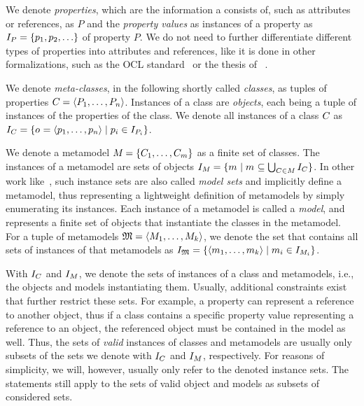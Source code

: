 We denote \emph{properties}, which are the information a \metaclass consists of, such as attributes or references, as $P$ and the \emph{property values} as instances of a property as $\instances{P} = \setted{p_1, p_2, \dots}$ of property $P$. 
We do not need to further differentiate different types of properties into attributes and references, like it is done in other formalizations, such as the OCL standard~\cite[A.1]{ocl} or the thesis of \citeauthor{kramer2017a}~\cite[2.3.2]{kramer2017a}.

We denote \emph{meta-classes}, in the following shortly called \emph{classes}, as tuples of properties $C_{} = \langle P_1, \dots, P_n \rangle$. 
Instances of a class are \emph{objects}, each being a tuple of instances of the properties of the class.
We denote all instances of a class $C_{}$ as $I_{C_{}} = \{ o_{} = \langle p_1, \dots, p_n \rangle \mid p_i \in I_{P_i} \}$.

We denote a metamodel $M_{} = \{ C_{1}, \dots, C_{m} \}$ as a finite set of classes.
The instances of a metamodel are sets of objects $I_{M_{}} = \{ m_{} \mid m_{} \subseteq \bigcup_{C_{} \in M_{}} I_{C_{}} \}$.
In other work like~\cite{stevens2020BidirectionalTransformationLarge-SoSym}, such instance sets are also called \emph{model sets} and implicitly define a metamodel, thus representing a lightweight definition of metamodels by simply enumerating its instances.
Each instance of a metamodel is called a \emph{model}, and represents a finite set of objects that instantiate the classes in the metamodel.
For a tuple of metamodels $\mathfrak{M} = \langle M_{1}, \dots, M_{k} \rangle$, we denote the set that contains all sets of instances of that metamodels as $I_{\mathfrak{M}} = \{  \langle m_{1}, \dots, m_{k} \rangle \mid m_{i} \in I_{M_{i}} \}$.

With $I_{C_{}}$ and $I_{M_{}}$, we denote the sets of instances of a class and metamodels, i.e., the objects and models instantiating them.
Usually, additional constraints exist that further restrict these sets.
For example, a property can represent a reference to another object, thus if a class contains a specific property value representing a reference to an object, the referenced object must be contained in the model as well.
Thus, the sets of \emph{valid} instances of classes and metamodels are usually only subsets of the sets we denote with $I_{C_{}}$ and $I_{M_{}}$, respectively.
For reasons of simplicity, we will, however, usually only refer to the denoted instance sets.
The statements still apply to the sets of valid object and models as subsets of considered sets.


